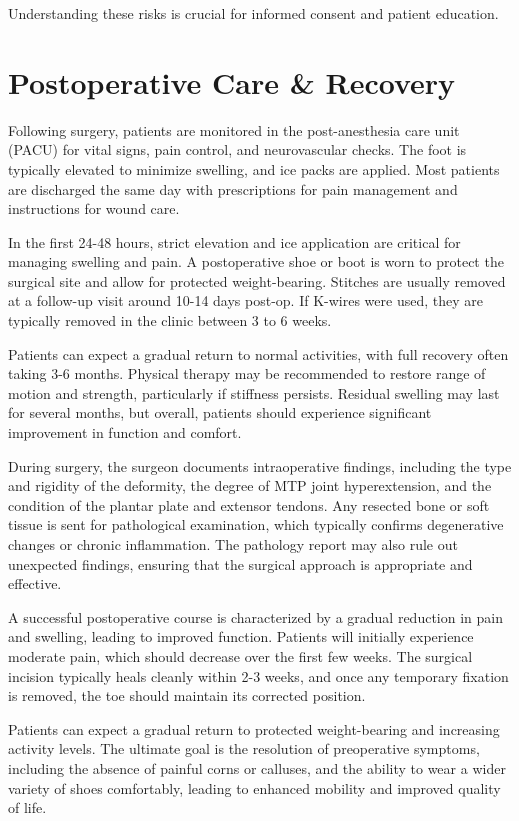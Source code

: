 Understanding these risks is crucial for informed consent and patient education.

\section*{Postoperative Care \& Recovery}
Following surgery, patients are monitored in the post-anesthesia care unit (PACU) for vital signs, pain control, and neurovascular checks. The foot is typically elevated to minimize swelling, and ice packs are applied. Most patients are discharged the same day with prescriptions for pain management and instructions for wound care.

In the first 24-48 hours, strict elevation and ice application are critical for managing swelling and pain. A postoperative shoe or boot is worn to protect the surgical site and allow for protected weight-bearing. Stitches are usually removed at a follow-up visit around 10-14 days post-op. If K-wires were used, they are typically removed in the clinic between 3 to 6 weeks.

Patients can expect a gradual return to normal activities, with full recovery often taking 3-6 months. Physical therapy may be recommended to restore range of motion and strength, particularly if stiffness persists. Residual swelling may last for several months, but overall, patients should experience significant improvement in function and comfort.

During surgery, the surgeon documents intraoperative findings, including the type and rigidity of the deformity, the degree of MTP joint hyperextension, and the condition of the plantar plate and extensor tendons. Any resected bone or soft tissue is sent for pathological examination, which typically confirms degenerative changes or chronic inflammation. The pathology report may also rule out unexpected findings, ensuring that the surgical approach is appropriate and effective.

A successful postoperative course is characterized by a gradual reduction in pain and swelling, leading to improved function. Patients will initially experience moderate pain, which should decrease over the first few weeks. The surgical incision typically heals cleanly within 2-3 weeks, and once any temporary fixation is removed, the toe should maintain its corrected position.

Patients can expect a gradual return to protected weight-bearing and increasing activity levels. The ultimate goal is the resolution of preoperative symptoms, including the absence of painful corns or calluses, and the ability to wear a wider variety of shoes comfortably, leading to enhanced mobility and improved quality of life.

